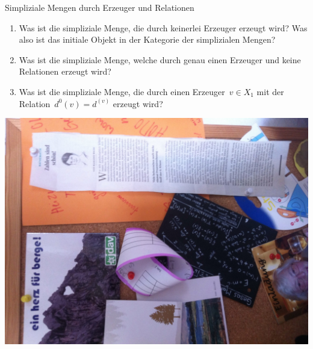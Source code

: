 \documentclass{uebblatt}
\begin{document}

\begin{aufgabe}{Simpliziale Mengen durch Erzeuger und Relationen}
\begin{enumerate}
\item Was ist die simpliziale Menge, die durch keinerlei Erzeuger erzeugt wird?
Was also ist das initiale Objekt in der Kategorie der simplizialen Mengen?
\item Was ist die simpliziale Menge, welche durch genau einen Erzeuger und
keine Relationen erzeugt wird?
\item Was ist die simpliziale Menge, die durch einen Erzeuger~$v \in X_1$ mit
der Relation~$d^0(v) = d^(v)$ erzeugt wird?
\end{enumerate}
\end{aufgabe}

\vfill
\centering
\includegraphics[scale=0.2]{images/moebiuspunkt}
\par
\end{document}
